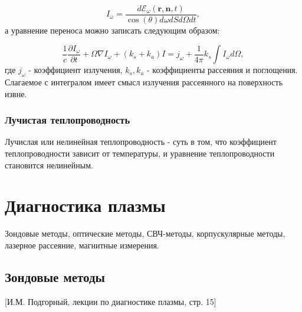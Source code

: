 \documentclass[10pt, a4paper]{article}
\let\stdsection\section
\renewcommand\section{\newpage\stdsection}
\begin{document}
\begin{equation}
    I_{\omega} = \frac{d\mathcal{E}_{\omega}(\mathbf{r},\mathbf{n},t)}{\cos(\theta)d\omega dSd\Omega dt},
\end{equation}
а уравнение переноса можно записать следующим образом:

\begin{equation}
    \frac{1}{c} \frac{\partial I_{\omega}}{\partial t} + \mathcal{\Omega}\nabla I_{\omega} + (k_s + k_a) I = j_{\omega} + \frac{1}{4\pi} k_s \int I_{\omega} d\Omega,
\end{equation}
где $j_{\omega}$ - коэффициент излучения, $k_s, k_a$ - коэффициенты рассеяния и поглощения. Слагаемое с интегралом имеет смысл излучения рассеянного на поверхность извне.

\subsubsection{Лучистая теплопроводность}

Лучислая или нелинейная теплопроводность - суть в том, что коэффициент теплопроводности зависит от температуры, и уравнение теплопроводности становится нелинейным.


\section{Диагностика плазмы}

Зондовые методы, оптические методы, СВЧ-методы, корпускулярные методы, лазерное рассеяние, магнитные измерения.

\subsection{Зондовые методы}

[И.М. Подгорный, лекции по диагностике плазмы, стр. 15]
\end{document}
